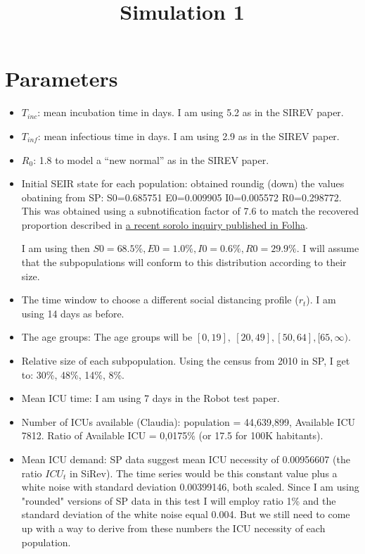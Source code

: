 \documentclass{article}
\title{Simulation 1}
\begin{document}
\section{Parameters}

\begin{itemize}
    \item $T_{inc}$: mean incubation time in days. I am using 5.2 as in the SIREV paper.

    \item $T_{inf}$: mean infectious time in days. I am using 2.9 as in the SIREV paper.

    \item $R_0$: 1.8 to model a ``new normal'' as in the SIREV paper.

    \item Initial SEIR state for each population: obtained roundig (down) the
    values obatining from SP: S0=0.685751 E0=0.009905 I0=0.005572 R0=0.298772. This was obtained using a subnotification factor of 7.6 to match the recovered proportion described in \href{https://www1.folha.uol.com.br/equilibrioesaude/2021/02/em-sp-um-terco-dos-adultos-tiveram-covid-taxa-sobe-a-quase-40-entre-negros.shtml}{a recent sorolo inquiry published in Folha}.
        
    {\color{red} I am using then $S0=68.5\%, E0=1.0\%, I0=0.6\%, R0=29.9\%$. I
    will assume that the subpopulations will conform to this distribution
    according to their size.} 
    
    \item The time window to choose a different social distancing profile
    ($r_t$). I am using 14 days as before. 

    \item The age groups: {\color{red} The age groups will be $[0, 19],\ [20, 49], [50, 64],  [65, \infty)$.} 
    
    \item Relative size of each subpopulation. Using the census from 2010 in SP, I get to: 30\%, 48\%, 14\%, 8\%. 

    \item Mean ICU time: I am using 7 days in the Robot test paper.
    
    \item Number of ICUs available (Claudia): population = 44,639,899, Available
    ICU 7812. Ratio of Available ICU = 0,0175\% (or 17.5 for 100K habitants).
    
    \item Mean ICU demand: SP data suggest mean ICU necessity of
    0.00956607 (the ratio $ICU_t$ in SiRev). The time series would be this
    constant value plus a white noise with standard deviation 0.00399146, both
    scaled. Since I am using "rounded" versions of SP data in this test I will
    employ ratio 1\% and the standard deviation of the white noise equal
    0.004. {\color{red} But we still need to come up with a way to derive from
    these numbers the ICU necessity of each population.}


\end{itemize}
\end{document}
